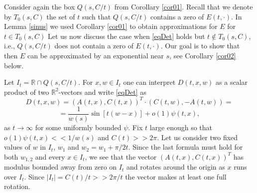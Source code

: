 \documentclass[11pt,twoside,reqno]{amsart}
\def\to{\rightarrow}
\def\R{{\mathbb R}}
\def\a{\alpha}
\theoremstyle{plain}
\numberwithin{equation}{section}
\begin{document}



Consider again the box $Q(s,C/t)$ from Corollary \ref{cor01}.
Recall that we denote by $T_0(s,C)$ the set of $t$ such that $Q(s,C/t)$ contains a zero of $E(t,\cdot)$.
In Lemma \ref{sinus} we used Corollary \ref{cor01} to obtain approximations for $E$  for $t\in T_0(s,C)$
Let us now discuss the case when \eqref{eqDet} holds but $t\not\in T_0(s,C)$, i.e., $Q(s,C/t)$ does not contain a zero
of $E(t,\cdot)$. Our goal is to show that then $E$ can be approximated by an exponential near $s$, see Corollary \ref{cor02} below.

Let $I_t=\R\cap Q(s,C/t)$. For $x,w\in I_t$ one can interpret $D(t,x,w)$ as a scalar product
of two $\R^2$-vectors and write \eqref{eqDet} as
$$D(t,x,w)=(A(t,x),C(t,x))^T\cdot (C(t,w),-A(t,w))=$$
\begin{equation}=\frac 1{w(s)}\sin [t(w-x)]+o(1)\psi(t,x),\label{eqsin1}\end{equation}
as $t\to \infty$ for some uniformly bounded $\psi$. Fix $t$ large enough so that
$o(1)\psi(t,x)<<1/w(s)$ and $C(t)>>2\pi$.
Let us consider  two fixed values of $w$ in $I_t$, $w_1$ and $w_2= w_1+\pi/2t$.
Since the last formula must hold for both $w_{1,2}$ and every $x\in I_t$, we see
that the vector $(A(t,x),C(t,x))^T$ has modulus bounded away from zero on $I_t$ and rotates around
the origin as $x$ runs over $I_t$. Since $|I_t|=C(t)/t>>2\pi/t$ the vector makes at least one full rotation.
\end{document}
